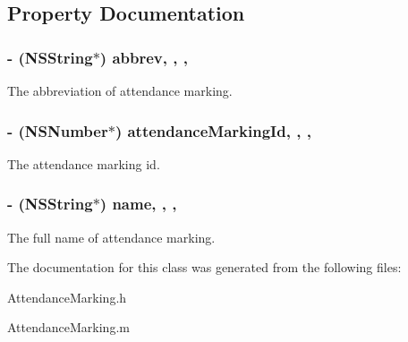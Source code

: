 \subsection{Property Documentation}
\hypertarget{interface_attendance_marking_af637cdd49ba462876b3fe6e6957049fc}{
\subsubsection[{abbrev}]{\setlength{\rightskip}{0pt plus 5cm}-\/ (N\+S\+String$\ast$) abbrev\hspace{0.3cm}{\ttfamily [read]}, {\ttfamily [write]}, {\ttfamily [nonatomic]}, {\ttfamily [assign]}}}\label{interface_attendance_marking_af637cdd49ba462876b3fe6e6957049fc}
The abbreviation of attendance marking. \hypertarget{interface_attendance_marking_a211012d0e662142f3b002b57f133b0db}{
\subsubsection[{attendance\+Marking\+Id}]{\setlength{\rightskip}{0pt plus 5cm}-\/ (N\+S\+Number$\ast$) attendance\+Marking\+Id\hspace{0.3cm}{\ttfamily [read]}, {\ttfamily [write]}, {\ttfamily [nonatomic]}, {\ttfamily [assign]}}}\label{interface_attendance_marking_a211012d0e662142f3b002b57f133b0db}
The attendance marking id. \hypertarget{interface_attendance_marking_a235155acb5a8b489b9829a09b6ac4b93}{
\subsubsection[{name}]{\setlength{\rightskip}{0pt plus 5cm}-\/ (N\+S\+String$\ast$) name\hspace{0.3cm}{\ttfamily [read]}, {\ttfamily [write]}, {\ttfamily [nonatomic]}, {\ttfamily [assign]}}}\label{interface_attendance_marking_a235155acb5a8b489b9829a09b6ac4b93}
The full name of attendance marking. 

The documentation for this class was generated from the following files\+:\begin{DoxyCompactItemize}
\item 
Attendance\+Marking.\+h\item 
Attendance\+Marking.\+m\end{DoxyCompactItemize}
